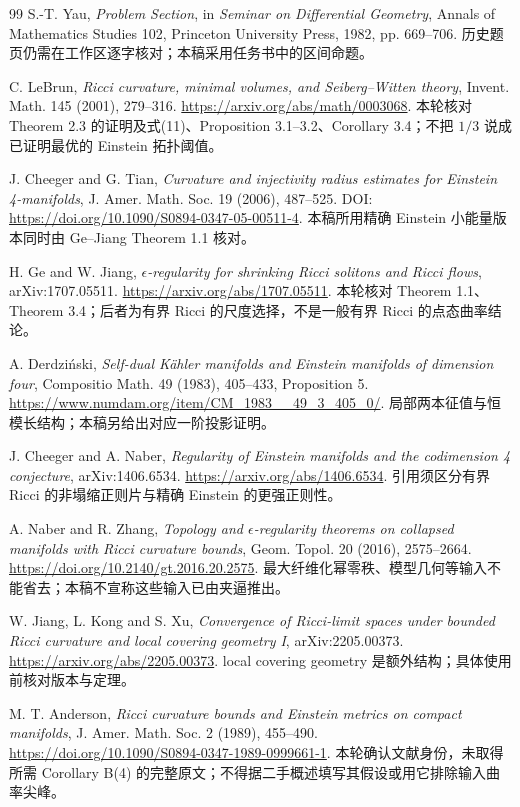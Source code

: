 \documentclass[UTF8,a4paper,11pt,fontset=fandol]{ctexart}
\numberwithin{equation}{section}
\theoremstyle{definition}
\begin{document}
\begin{thebibliography}{99}
 S.-T. Yau, \emph{Problem Section}, in \emph{Seminar on Differential Geometry}, Annals of Mathematics Studies 102, Princeton University Press, 1982, pp. 669--706. 历史题页仍需在工作区逐字核对；本稿采用任务书中的区间命题。

 C. LeBrun, \emph{Ricci curvature, minimal volumes, and Seiberg--Witten theory}, Invent. Math. 145 (2001), 279--316. \url{https://arxiv.org/abs/math/0003068}. 本轮核对 Theorem 2.3 的证明及式(11)、Proposition 3.1--3.2、Corollary 3.4；不把 $1/3$ 说成已证明最优的 Einstein 拓扑阈值。

 J. Cheeger and G. Tian, \emph{Curvature and injectivity radius estimates for Einstein 4-manifolds}, J. Amer. Math. Soc. 19 (2006), 487--525. DOI: \url{https://doi.org/10.1090/S0894-0347-05-00511-4}. 本稿所用精确 Einstein 小能量版本同时由 Ge--Jiang Theorem 1.1 核对。

 H. Ge and W. Jiang, \emph{$\epsilon$-regularity for shrinking Ricci solitons and Ricci flows}, arXiv:1707.05511. \url{https://arxiv.org/abs/1707.05511}. 本轮核对 Theorem 1.1、Theorem 3.4；后者为有界 Ricci 的尺度选择，不是一般有界 Ricci 的点态曲率结论。

 A. Derdzi\'nski, \emph{Self-dual K\"ahler manifolds and Einstein manifolds of dimension four}, Compositio Math. 49 (1983), 405--433, Proposition 5. \url{https://www.numdam.org/item/CM_1983__49_3_405_0/}. 局部两本征值与恒模长结构；本稿另给出对应一阶投影证明。

 J. Cheeger and A. Naber, \emph{Regularity of Einstein manifolds and the codimension 4 conjecture}, arXiv:1406.6534. \url{https://arxiv.org/abs/1406.6534}. 引用须区分有界 Ricci 的非塌缩正则片与精确 Einstein 的更强正则性。

 A. Naber and R. Zhang, \emph{Topology and $\epsilon$-regularity theorems on collapsed manifolds with Ricci curvature bounds}, Geom. Topol. 20 (2016), 2575--2664. \url{https://doi.org/10.2140/gt.2016.20.2575}. 最大纤维化幂零秩、模型几何等输入不能省去；本稿不宣称这些输入已由夹逼推出。

 W. Jiang, L. Kong and S. Xu, \emph{Convergence of Ricci-limit spaces under bounded Ricci curvature and local covering geometry I}, arXiv:2205.00373. \url{https://arxiv.org/abs/2205.00373}. local covering geometry 是额外结构；具体使用前核对版本与定理。

 M. T. Anderson, \emph{Ricci curvature bounds and Einstein metrics on compact manifolds}, J. Amer. Math. Soc. 2 (1989), 455--490. \url{https://doi.org/10.1090/S0894-0347-1989-0999661-1}. 本轮确认文献身份，未取得所需 Corollary B(4) 的完整原文；不得据二手概述填写其假设或用它排除输入曲率尖峰。


\end{thebibliography}
\end{document}
